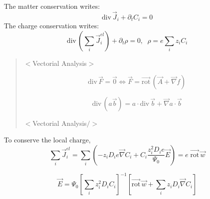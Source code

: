 \documentclass[aps,12pt]{revtex4}
\newcommand{\grad}{\vec{\nabla}}
\newcommand{\divg}{{\mathrm{div}\,}}
\newcommand{\rot}{\overrightarrow{\mathrm{rot}}\,}
\begin{document}
The matter conservation writes:
\begin{equation}
	\divg \vec{J}_i + \partial_t C_i = 0
\end{equation}
The charge conservation writes:
\begin{equation}
	\divg \left( \sum_i \vec{J}^{el}_i \right) + \partial_t \rho = 0, \;\; \rho = e \sum_i z_i C_i
\end{equation}

\begin{quote}
\centerline{$<$Vectorial Analysis$>$}
\begin{equation}
	\divg \vec{F} = \vec{0} \Leftrightarrow \vec{F} = \rot (\vec{A} + \grad f)
\end{equation}

\begin{equation}
	\divg (a\vec{b}) = a \cdot \divg \vec{b} + \grad a \cdot \vec{b}
\end{equation}
\centerline{$<$Vectorial Analysis$/>$}

\end{quote}

To conserve the local charge,
\begin{equation}
	\sum_i \vec{J}^{el}_i = \sum_i\left( - z_i D_i e  \grad C_i + C_i \dfrac{z_i^2 D_i e}{\Psi_0}  \vec{E} \right) = e \; \rot\vec{w}
\end{equation}

\begin{equation}
	\vec{E} = \Psi_0 \left[ \sum_i z_i^2 D_i C_i  \right]^{-1} \left[ \rot\vec{w} + \sum_i z_i D_i \grad C_i \right]
\end{equation}
\end{document}
